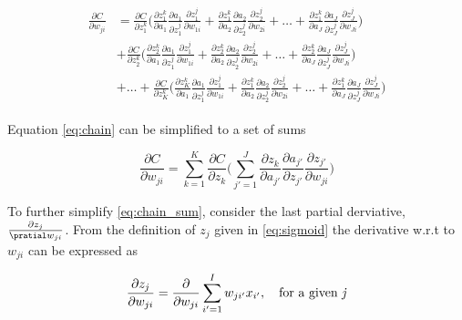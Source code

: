 \documentclass{article}
\begin{document}
\begin{align}
\begin{split}
    \frac{\partial C}{\partial w_{ji}} &= \frac{\partial C}{\partial z_1^k} \Bigg( 
    \frac{\partial z_1^k}{\partial a_1}\frac{\partial a_1}{\partial  z^j_1} \frac{\partial z^j_1}{\partial w_{1i}} + \frac{\partial z_1^k}{\partial a_2}\frac{\partial a_2}{\partial  z^j_2} \frac{\partial z^j_2}{\partial w_{2i}} + \dots + \frac{\partial z_1^k}{\partial a_J}\frac{\partial a_J}{\partial  z^j_J} \frac{\partial z^j_J}{\partial w_{Ji}}\Bigg) \\
    &+ \frac{\partial C}{\partial z_2^k} \Bigg( 
    \frac{\partial z_2^k}{\partial a_1}\frac{\partial a_1}{\partial  z^j_1} \frac{\partial z^j_1}{\partial w_{1i}} + \frac{\partial z_2^k}{\partial a_2}\frac{\partial a_2}{\partial  z^j_2} \frac{\partial z^j_2}{\partial w_{2i}} + \dots + \frac{\partial z_2^k}{\partial a_J}\frac{\partial a_J}{\partial  z^j_J} \frac{\partial z^j_J}{\partial w_{Ji}}\Bigg) \\
    &+ \dots + \frac{\partial C}{\partial z_K^k} \Bigg( 
    \frac{\partial z_K^k}{\partial a_1}\frac{\partial a_1}{\partial  z^j_1} \frac{\partial z^j_1}{\partial w_{1i}} + \frac{\partial z_1^k}{\partial a_2}\frac{\partial a_2}{\partial  z^j_2} \frac{\partial z^j_2}{\partial w_{2i}} + \dots + \frac{\partial z_1^k}{\partial a_J}\frac{\partial a_J}{\partial  z^j_J} \frac{\partial z^j_J}{\partial w_{Ji}}\Bigg) 
\end{split} \label{eq:chain}
\end{align}

Equation \eqref{eq:chain} can be simplified to a set of sums

\begin{equation}
    \frac{\partial C}{\partial w_{ji}} = \sum_{k=1}^K \frac{\partial C}{\partial z_k}\Bigg( \sum_{j'=1}^J \frac{\partial z_k}{\partial a_{j'}}\frac{\partial a_{j'}}{\partial z_{j'}}\frac{\partial z_{j'}}{\partial w_{ji}} \Bigg)
    \label{eq:chain_sum}
\end{equation}

To further simplify \eqref{eq:chain_sum}, consider the last partial derviative, $\frac{\partial z_j}{\pratial w_{ji}}$. From the definition of $z_j$ given in \eqref{eq:sigmoid} the derivative w.r.t to $w_{ji}$ can be expressed as

\begin{equation}
    \frac{\partial z_j}{\partial w_{ji}} = \frac{\partial}{\partial w_{ji}} \sum_{i'=1}^I w_{ji'}x_{i'}, \quad \text{for a given \textit{j}}
    \label{eq:diffzj}
\end{equation}
\end{document}
